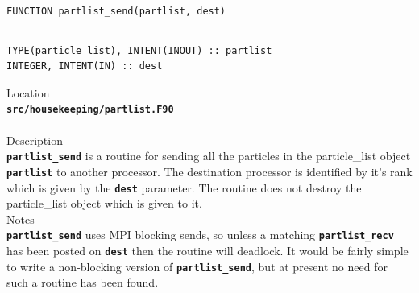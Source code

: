 \documentclass[12pt,a4paper]{article}
\newcommand{\HRule}{\rule{\linewidth}{0.5mm}}
\newcommand{\inlinecode}[1]{{\color{warwickred} \bf\texttt{#1}}}
\newcommand{\codedef}{\begin{Verbatim}[formatcom=\color{warwickred},fontsize=\Large,hfuzz=0pt]}
\newcommand{\coderule}{
{\color{warwickred}\vspace{-0.5cm}\HRule}
\codedef}
\begin{document}
\pagebreak
\codedef
FUNCTION partlist_send(partlist, dest)
\end{Verbatim}
\coderule
TYPE(particle_list), INTENT(INOUT) :: partlist
INTEGER, INTENT(IN) :: dest
\end{Verbatim}
\vspace{1cm}
{\Large Location\\}
\inlinecode{src/housekeeping/partlist.F90}\\
\\[0.5cm]
{\Large Description\\}
\inlinecode{partlist\_send} is a routine for sending all the particles in the
particle\_list object \inlinecode{partlist} to another processor. The destination
processor is identified by it's rank which is given by the \inlinecode{dest}
parameter. The routine does not destroy the particle\_list object which is given
to it.
\\[0.5cm]
{\Large Notes\\}
\inlinecode{partlist\_send} uses MPI blocking sends, so unless a matching
\inlinecode{partlist\_recv} has been posted on \inlinecode{dest} then the
routine will deadlock. It would be fairly simple to write a non-blocking
version of \inlinecode{partlist\_send}, but at present no need for such a
routine has been found.
\end{document}
